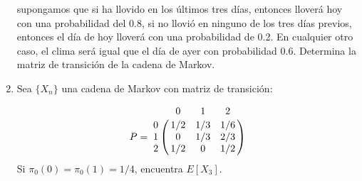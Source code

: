\documentclass{report}
\begin{document}
\begin{enumerate}
supongamos que si ha llovido en los últimos tres días, entonces lloverá hoy con una probabilidad del 0.8, si no llovió en ninguno de los tres días previos, entonces el día de hoy lloverá con una probabilidad de 0.2. En cualquier otro caso, el clima será igual que el día de ayer con probabilidad 0.6. Determina la matriz de transición de la cadena de Markov.
\item Sea $\{X_n\}$ una cadena de Markov con matriz de transición:

$$
P = \bordermatrix{~ & 0   & 1   & 2 \cr
                  0 & 1/2 & 1/3 & 1/6 \cr
                  1 & 0   & 1/3 & 2/3 \cr
                  2 & 1/2 & 0   & 1/2 \cr             
                  }
$$
Si $\pi_0(0) = \pi_0(1)=1/4$, encuentra $E[X_3]$.
\end{enumerate}
\end{document}
